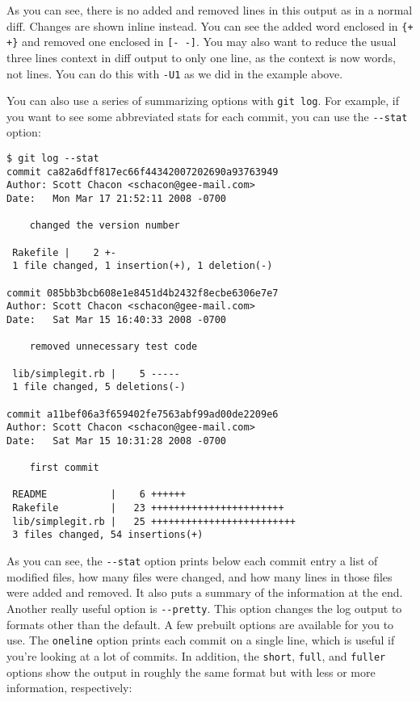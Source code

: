 \documentclass[a4paper]{book}
\begin{document}
As you can see, there is no added and removed lines in this output as in a normal diff. Changes are shown inline instead. You can see the added word enclosed in \texttt{\{+ +\}} and removed one enclosed in \texttt{{[}- -{]}}. You may also want to reduce the usual three lines context in diff output to only one line, as the context is now words, not lines. You can do this with \texttt{-U1} as we did in the example above.

You can also use a series of summarizing options with \texttt{git log}. For example, if you want to see some abbreviated stats for each commit, you can use the \texttt{-{}-stat} option:

\begin{shaded}\begin{verbatim}
$ git log --stat
commit ca82a6dff817ec66f44342007202690a93763949
Author: Scott Chacon <schacon@gee-mail.com>
Date:   Mon Mar 17 21:52:11 2008 -0700

    changed the version number

 Rakefile |    2 +-
 1 file changed, 1 insertion(+), 1 deletion(-)

commit 085bb3bcb608e1e8451d4b2432f8ecbe6306e7e7
Author: Scott Chacon <schacon@gee-mail.com>
Date:   Sat Mar 15 16:40:33 2008 -0700

    removed unnecessary test code

 lib/simplegit.rb |    5 -----
 1 file changed, 5 deletions(-)

commit a11bef06a3f659402fe7563abf99ad00de2209e6
Author: Scott Chacon <schacon@gee-mail.com>
Date:   Sat Mar 15 10:31:28 2008 -0700

    first commit

 README           |    6 ++++++
 Rakefile         |   23 +++++++++++++++++++++++
 lib/simplegit.rb |   25 +++++++++++++++++++++++++
 3 files changed, 54 insertions(+)
\end{verbatim}\end{shaded}

As you can see, the \texttt{-{}-stat} option prints below each commit entry a list of modified files, how many files were changed, and how many lines in those files were added and removed. It also puts a summary of the information at the end. Another really useful option is \texttt{-{}-pretty}. This option changes the log output to formats other than the default. A few prebuilt options are available for you to use. The \texttt{oneline} option prints each commit on a single line, which is useful if you're looking at a lot of commits. In addition, the \texttt{short}, \texttt{full}, and \texttt{fuller} options show the output in roughly the same format but with less or more information, respectively:
\end{document}
